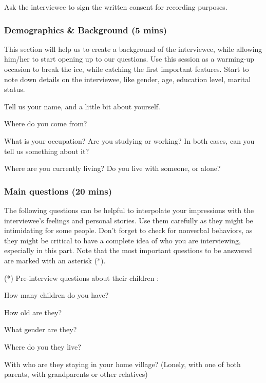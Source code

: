 \begin{todolist}
    \item Ask the interviewee to sign the written consent for recording purposes.
\end{todolist}

\vspace{2pt}
\subsubsection{Demographics \& Background (5 mins)}

This section will help us to create a background of the interviewee, while allowing him/her to start opening up to our questions. Use this session as a warming-up occasion to break the ice, while catching the first important features. Start to note down details on the interviewee, like gender, age, education level, marital status.

\begin{todolist}
    \item Tell us your name, and a little bit about yourself.
    \item Where do you come from?
    \item What is your occupation? Are you studying or working? In both cases, can you tell us something about it?
    \item Where are you currently living? Do you live with someone, or alone? 
\end{todolist}

\vspace{2pt}
\subsubsection{Main questions (20 mins)}

The following questions can be helpful to interpolate your impressions with the interviewee’s feelings and personal stories. Use them carefully as they might be intimidating for some people. Don’t forget to check for nonverbal behaviors, as they might be critical to have a complete idea of who you are interviewing, especially in this part. Note that the most important questions to be answered are marked with an asterisk (*).

\vspace{2pt}
(*) Pre-interview questions about their children :

\begin{todolist}
    \item How many children do you have?
    \item How old are they?
    \item What gender are they?
    \item Where do you they live?
    \item With who are they staying in your home village? (Lonely, with one of both parents, with grandparents or other relatives)
\end{todolist}

